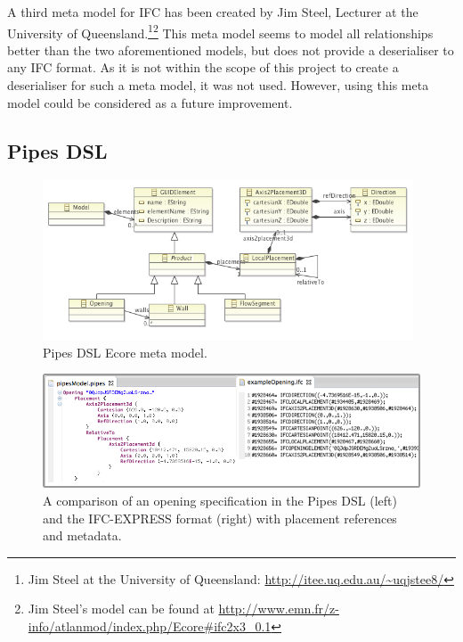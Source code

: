 A third meta model for IFC has been created by Jim Steel, Lecturer at the University of Queensland.\footnote{Jim Steel at the University of Queensland: \url{http://itee.uq.edu.au/~uqjstee8/}}\footnote{Jim Steel's model can be found at \url{http://www.emn.fr/z-info/atlanmod/index.php/Ecore#ifc2x3_0.1}} This meta model seems to model all relationships better than the two aforementioned models, but does not provide a deserialiser to any IFC format. As it is not within the scope of this project to create a deserialiser for such a meta model, it was not used. However, using this meta model could be considered as a future improvement.

\subsection{Pipes DSL}
\label{subsec:pipes_dsl}

\begin{figure}[t]
    \centering
        \includegraphics[width=110mm]{images/PipesEcoreModel.png}
    \caption{Pipes DSL Ecore meta model.}
    \label{fig:pipes_dsl_ecore_model}
\end{figure}

\begin{figure}[t]
    \centering
        \includegraphics[width=120mm]{images/pipesAndExpressExample.png}
    \caption{A comparison of an opening specification in the Pipes DSL (left) and the IFC-EXPRESS format (right) with placement references and metadata.}
    \label{fig:pipes_express_comparison}
\end{figure}

